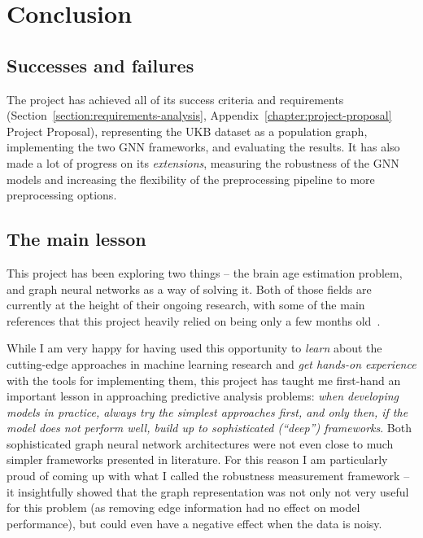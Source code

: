 \chapter{Conclusion}



\section{Successes and failures}

The project has achieved all of its success criteria and requirements (Section~\ref{section:requirements-analysis}, Appendix~\ref{chapter:project-proposal} Project Proposal), representing the UKB dataset as a population graph, implementing the two GNN frameworks, and evaluating the results. It has also made a lot of progress on its \textit{extensions}, measuring the robustness of the GNN models and increasing the flexibility of the preprocessing pipeline to more preprocessing options.

\section{The main lesson}
This project has been exploring two things – the brain age estimation problem, and graph neural networks as a way of solving it. Both of those fields are currently at the height of their ongoing research, with some of the main references that this project heavily relied on being only a few months old~\cite{kaufmann2019, niu2019improved, pervaiz2020optimising}.

While I am very happy for having used this opportunity to \textit{learn} about the cutting-edge approaches in machine learning research and \textit{get hands-on experience} with the tools for implementing them, this project has taught me first-hand an important lesson in approaching predictive analysis problems: \textit{when developing models in practice, always try the simplest approaches first, and only then, if the model does not perform well, build up to sophisticated (``deep'') frameworks}. Both sophisticated graph neural network architectures were not even close to much simpler frameworks presented in literature. For this reason I am particularly proud of coming up with what I called the robustness measurement framework – it insightfully showed that the graph representation was not only not very useful for this problem (as removing edge information had no effect on model performance), but could even have a negative effect when the data is noisy.

